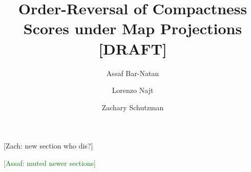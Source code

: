 \documentclass[11pt]{article}
\title{Order-Reversal of Compactness Scores under Map Projections [DRAFT]}
\author{Assaf Bar-Natan \and Lorenzo Najt \and Zachary Schutzman }%
\newcommand{\mute}[1]{}
\theoremstyle{definition}
\theoremstyle{remark}
\newif \ifdraft \drafttrue
\newcommand{\zs}[1]{\ifdraft \textcolor{RedViolet}{[Zach: #1]} \fi}
\newcommand{\abn}[1]{\ifdraft \textcolor{Green}{[Assaf: #1]} \fi}
\begin{document}
\maketitle
	
\begin{abstract}

\end{abstract}





\zs{new section who dis?}





\abn{muted newer sections}
\mute{



}



\end{document}
